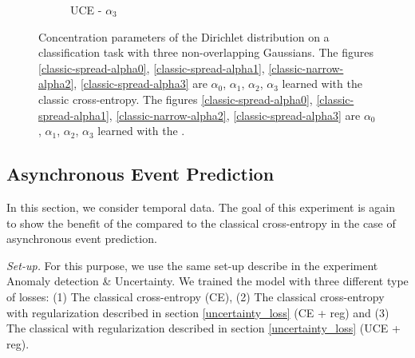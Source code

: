 \begin{figure}[H]
\begin{subfigure}{0.24\textwidth}
        \caption{UCE - $\alpha_3$}
        \label{new-spread-alpha3}
    \end{subfigure}
    \caption{Concentration parameters of the Dirichlet distribution on a classification task with three non-overlapping Gaussians. The figures \ref{classic-spread-alpha0}, \ref{classic-spread-alpha1}, \ref{classic-narrow-alpha2}, \ref{classic-spread-alpha3} are $\alpha_0$, $\alpha_1$, $\alpha_2$, $\alpha_3$ learned with the classic cross-entropy. The figures \ref{classic-spread-alpha0}, \ref{classic-spread-alpha1}, \ref{classic-narrow-alpha2}, \ref{classic-spread-alpha3} are $\alpha_0$, $\alpha_1$, $\alpha_2$, $\alpha_3$ learned with the \UncertaintyLoss.}
    \label{fig:alpha_classification2}
\end{figure}

\subsection{Asynchronous Event Prediction}

In this section, we consider temporal data. The goal of this experiment is again to show the benefit of the \UncertaintyLoss compared to the classical cross-entropy in the case of asynchronous event prediction.

\textit{Set-up.} For this purpose, we use the same set-up describe in the experiment Anomaly detection \& Uncertainty. We trained the model \DirModel with three different type of losses: (1) The classical cross-entropy (CE), (2) The classical cross-entropy with regularization described in section \ref{uncertainty_loss} (CE + reg) and (3) The classical \UncertaintyLoss with regularization described in section \ref{uncertainty_loss} (UCE + reg).

